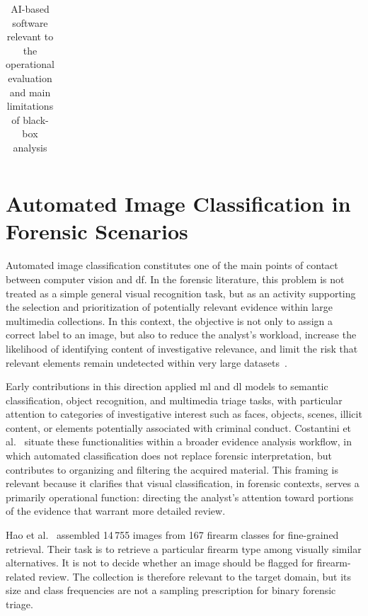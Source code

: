 \begin{table}[htbp]
\begin{tabularx}{\textwidth}{@{}p{2.8cm}p{3.5cm}X p{3.2cm}@{}}
        \bottomrule
    \end{tabularx}
    \caption{AI-based software relevant to the operational evaluation and main limitations of black-box analysis}
    \label{tab:sota_ai_based_software}
\end{table}


\section{Automated Image Classification in Forensic Scenarios}
\label{sec:sota-image-classification}

Automated image classification constitutes one of the main points of contact
between computer vision and \gls{df}. In the forensic literature, this problem
is not treated as a simple general visual recognition task, but as an activity
supporting the selection and prioritization of potentially relevant evidence
within large multimedia collections. In this context, the objective is not only
to assign a correct label to an image, but also to reduce the analyst's
workload, increase the likelihood of identifying content of investigative
relevance, and limit the risk that relevant elements remain undetected within
very large datasets~\cite{costantini2019digital,sanna2024preliminary}.

Early contributions in this direction applied \gls{ml} and \gls{dl} models to
semantic classification, object recognition, and multimedia triage tasks, with
particular attention to categories of investigative interest such as faces,
objects, scenes, illicit content, or elements potentially associated with
criminal conduct. Costantini et al.~\cite{costantini2019digital} situate these
functionalities within a broader evidence analysis workflow, in which automated
classification does not replace forensic interpretation, but contributes to
organizing and filtering the acquired material. This framing is relevant
because it clarifies that visual classification, in forensic contexts, serves a
primarily operational function: directing the analyst's attention toward
portions of the evidence that warrant more detailed review.

Hao et al.~\cite{Hao2018DeepFirearm} assembled 14\,755 images from 167
firearm classes for fine-grained retrieval. Their task is to retrieve a
particular firearm type among visually similar alternatives. It is not to
decide whether an image should be flagged for firearm-related review. The
collection is therefore relevant to the target domain, but its size and
class frequencies are not a sampling prescription for binary forensic triage.

